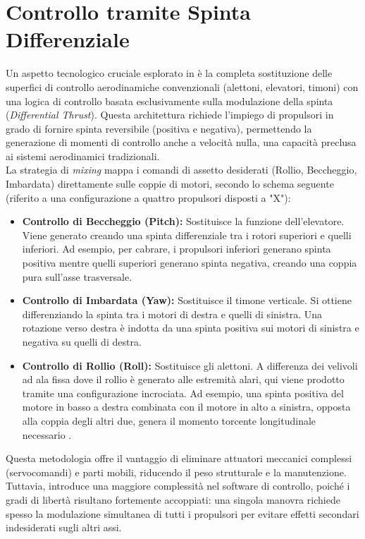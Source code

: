 \section{Controllo tramite Spinta Differenziale}
Un aspetto tecnologico cruciale esplorato in \cite{riboldi2023} è la completa sostituzione delle superfici di controllo aerodinamiche convenzionali (alettoni, elevatori, timoni) con una logica di controllo basata esclusivamente sulla modulazione della spinta (\textit{Differential Thrust}).
Questa architettura richiede l'impiego di propulsori in grado di fornire spinta reversibile (positiva e negativa), permettendo la generazione di momenti di controllo anche a velocità nulla, una capacità preclusa ai sistemi aerodinamici tradizionali.
\\La strategia di \textit{mixing} mappa i comandi di assetto desiderati (Rollio, Beccheggio, Imbardata) direttamente sulle coppie di motori, secondo lo schema seguente (riferito a una configurazione a quattro propulsori disposti a "X"):
\begin{itemize}
    \item \textbf{Controllo di Beccheggio (Pitch):} Sostituisce la funzione dell'elevatore. Viene generato creando una spinta differenziale tra i rotori superiori e quelli inferiori. Ad esempio, per cabrare, i propulsori inferiori generano spinta positiva mentre quelli superiori generano spinta negativa, creando una coppia pura sull'asse trasversale.
    \item \textbf{Controllo di Imbardata (Yaw):} Sostituisce il timone verticale. Si ottiene differenziando la spinta tra i motori di destra e quelli di sinistra. Una rotazione verso destra è indotta da una spinta positiva sui motori di sinistra e negativa su quelli di destra.
    \item \textbf{Controllo di Rollio (Roll):} Sostituisce gli alettoni. A differenza dei velivoli ad ala fissa dove il rollio è generato alle estremità alari, qui viene prodotto tramite una configurazione incrociata. Ad esempio, una spinta positiva del motore in basso a destra combinata con il motore in alto a sinistra, opposta alla coppia degli altri due, genera il momento torcente longitudinale necessario \cite{riboldi2023}.
\end{itemize}
Questa metodologia offre il vantaggio di eliminare attuatori meccanici complessi (servocomandi) e parti mobili, riducendo il peso strutturale e la manutenzione. Tuttavia, introduce una maggiore complessità nel software di controllo, poiché i gradi di libertà risultano fortemente accoppiati: una singola manovra richiede spesso la modulazione simultanea di tutti i propulsori per evitare effetti secondari indesiderati sugli altri assi.